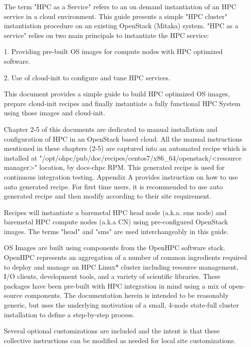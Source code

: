 The term "HPC as a Service" refers to an on demand instantiation of an HPC service in a cloud environment. This guide presents a simple "HPC cluster" instantiation procedure on an existing OpenStack (Mitaka) system. "HPC as a service" relies on two main principals to instantiate the HPC service:


\begin{list}{}
	\item 	1. Providing pre-built OS images for compute nodes with HPC optimized software.
	\item   2. Use of cloud-init to configure and tune HPC services.
	\item   
	 
\end{list}
	
This document provides a simple guide to build HPC optimized OS images, prepare cloud-init recipes and finally instantiate a fully functional HPC System using those images and cloud-init. 

Chapter 2-5 of this documents are dedicated to manual installation and configuration of HPC in an OpenStack based cloud. All the manual instructions mentioned in these chapters (2-5) are captured into an automated recipe which is installed at "/opt/ohpc/pub/doc/recipes/centos7/x86\_64/openstack/<resource manager>" location, by docs-chpc RPM. This generated recipe is used for continuous integration testing. 
Appendix A provides instruction on how to use auto generated recipe. For first time users, it is recommended to use auto generated recipe and then modify according to their site requirement.

Recipes will instantiate a baremetal HPC head node (a.k.a. sms node) and baremetal HPC compute nodes (a.k.a CN) using pre-configured OpenStack images. The terms "head" and "sms" are used interchangeably in this guide.

OS Images are built using components from the OpenHPC software stack. OpenHPC represents an aggregation of a number of common ingredients required to deploy and manage an HPC Linux* cluster including resource management, I/O clients, development tools, and a variety of scientific libraries. These packages have been pre-built with HPC integration in mind using a mix of open-source components. The documentation herein is intended to be reasonably generic,
but uses the underlying motivation of a small, 4-node state-full cluster installation to define a step-by-step process. 

Several optional customizations are included and the intent is that these collective instructions can be modified as needed for local site customizations.

